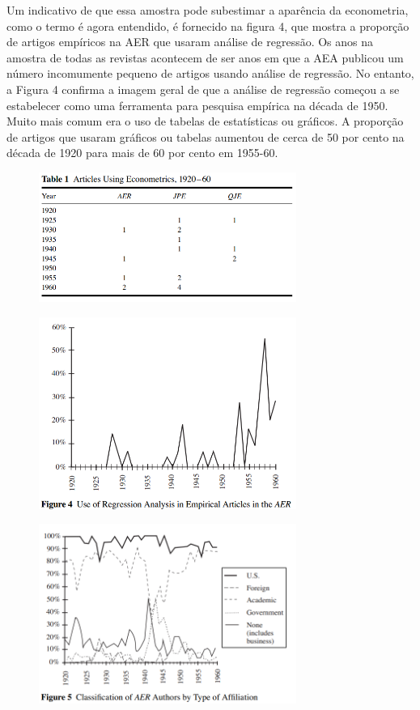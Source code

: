 \documentclass[12pt]{article}
\begin{document}
Um indicativo de que essa amostra pode subestimar a aparência da econometria, como o termo é agora entendido, é fornecido na figura 4, que mostra a proporção de artigos empíricos na AER que usaram análise de regressão. Os anos na amostra de todas as revistas acontecem de ser anos em que a AEA publicou um número incomumente pequeno de artigos usando análise de regressão. No entanto, a Figura 4 confirma a imagem geral de que a análise de regressão começou a se estabelecer como uma ferramenta para pesquisa empírica na década de 1950. Muito mais comum era o uso de tabelas de estatísticas ou gráficos. A proporção de artigos que usaram gráficos ou tabelas aumentou de cerca de 50 por cento na década de 1920 para mais de 60 por cento em 1955-60.

\begin{figure}[H]
    \centering
    \includegraphics[width=0.75\textwidth]{table 1.png}
    \end{figure}

\begin{figure}[H]
    \centering
    \includegraphics[width=0.75\textwidth]{figure 4.png}
    \end{figure}

\begin{figure}[H]
    \centering
    \includegraphics[width=0.75\textwidth]{figure 5.png}
    \end{figure}
\end{document}
